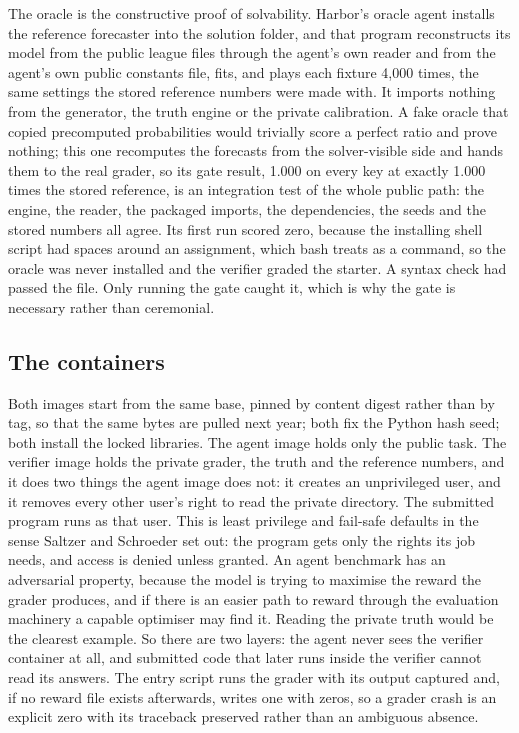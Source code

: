 \documentclass[11pt,letterpaper]{article}
\begin{document}
The oracle is the constructive proof of solvability. Harbor's oracle agent installs the reference forecaster into the solution folder, and that program reconstructs its model from the public league files through the agent's own reader and from the agent's own public constants file, fits, and plays each fixture 4,000 times, the same settings the stored reference numbers were made with. It imports nothing from the generator, the truth engine or the private calibration. A fake oracle that copied precomputed probabilities would trivially score a perfect ratio and prove nothing; this one recomputes the forecasts from the solver-visible side and hands them to the real grader, so its gate result, 1.000 on every key at exactly 1.000 times the stored reference, is an integration test of the whole public path: the engine, the reader, the packaged imports, the dependencies, the seeds and the stored numbers all agree. Its first run scored zero, because the installing shell script had spaces around an assignment, which bash treats as a command, so the oracle was never installed and the verifier graded the starter. A syntax check had passed the file. Only running the gate caught it, which is why the gate is necessary rather than ceremonial.


\subsection{The containers}

Both images start from the same base, pinned by content digest rather than by tag, so that the same bytes are pulled next year; both fix the Python hash seed; both install the locked libraries. The agent image holds only the public task. The verifier image holds the private grader, the truth and the reference numbers, and it does two things the agent image does not: it creates an unprivileged user, and it removes every other user's right to read the private directory. The submitted program runs as that user. This is least privilege and fail-safe defaults in the sense Saltzer and Schroeder set out: the program gets only the rights its job needs, and access is denied unless granted. An agent benchmark has an adversarial property, because the model is trying to maximise the reward the grader produces, and if there is an easier path to reward through the evaluation machinery a capable optimiser may find it. Reading the private truth would be the clearest example. So there are two layers: the agent never sees the verifier container at all, and submitted code that later runs inside the verifier cannot read its answers. The entry script runs the grader with its output captured and, if no reward file exists afterwards, writes one with zeros, so a grader crash is an explicit zero with its traceback preserved rather than an ambiguous absence.
\end{document}
